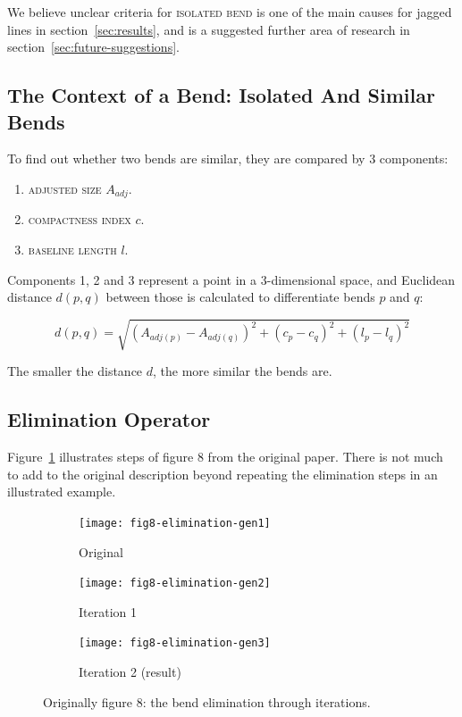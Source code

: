 \documentclass[a4paper]{article}
\begin{document}
We believe unclear criteria for \textsc{isolated bend} is one of the main
causes for jagged lines in section~\ref{sec:results}, and is a suggested
further area of research in section~\ref{sec:future-suggestions}.

\subsection{The Context of a Bend: Isolated And Similar Bends}

To find out whether two bends are similar, they are compared by 3 components:

\begin{enumerate}
  \item \textsc{adjusted size} $A_{adj}$.
  \item \textsc{compactness index} $c$.
  \item \textsc{baseline length} $l$.
\end{enumerate}

Components 1, 2 and 3 represent a point in a 3-dimensional space, and Euclidean
distance $d(p,q)$ between those is calculated to differentiate bends $p$ and
$q$:

\[
  d(p,q) = \sqrt{(A_{adj(p)}-A_{adj(q)})^2 +
                   (c_p-c_q)^2 +
                   (l_p-l_q)^2}
\]

The smaller the distance $d$, the more similar the bends are.

\subsection{Elimination Operator}

Figure~\ref{fig:elimination-through-iterations} illustrates steps of figure 8
from the original paper. There is not much to add to the original description
beyond repeating the elimination steps in an illustrated example.

\begin{figure}[ht]
    \centering
    \begin{subfigure}[b]{.7\textwidth}
        \texttt{[image: fig8-elimination-gen1]}
        \caption{Original}
    \end{subfigure}
    \begin{subfigure}[b]{.7\textwidth}
        \texttt{[image: fig8-elimination-gen2]}
        \caption{Iteration 1}
    \end{subfigure}
    \begin{subfigure}[b]{.7\textwidth}
        \texttt{[image: fig8-elimination-gen3]}
        \caption{Iteration 2 (result)}
    \end{subfigure}
    \caption{Originally figure 8: the bend elimination through iterations.}
    \label{fig:elimination-through-iterations}
\end{figure}
\end{document}

